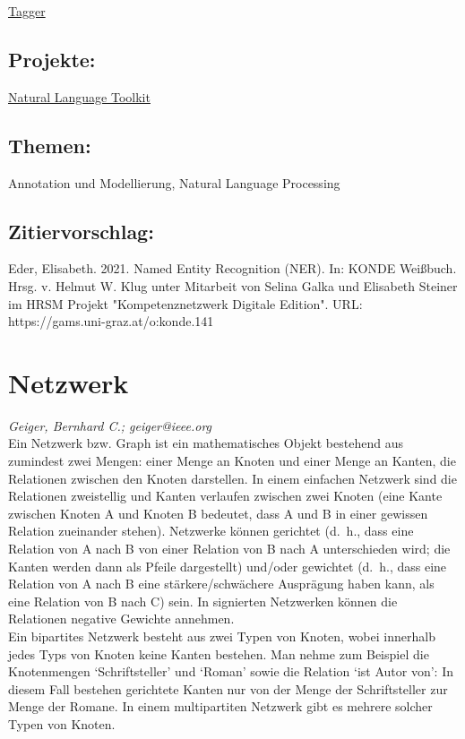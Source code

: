\documentclass{article}
\begin{document}
\href{https://gams.uni-graz.at/o:konde.176}{Tagger}\subsection*{Projekte:}\href{https://www.nltk.org}{Natural Language Toolkit}\subsection*{Themen:}Annotation und Modellierung, Natural Language Processing\subsection*{Zitiervorschlag:}Eder, Elisabeth. 2021. Named Entity Recognition (NER). In: KONDE Weißbuch. Hrsg. v. Helmut W. Klug unter Mitarbeit von Selina Galka und Elisabeth Steiner im HRSM Projekt "Kompetenznetzwerk Digitale Edition". URL: https://gams.uni-graz.at/o:konde.141\newpage\section*{Netzwerk} \emph{Geiger, Bernhard C.; geiger@ieee.org }\\
        
    Ein Netzwerk bzw. Graph ist ein mathematisches Objekt bestehend aus zumindest zwei Mengen: einer Menge an Knoten und einer Menge an Kanten, die Relationen zwischen den Knoten darstellen. In einem einfachen Netzwerk sind die Relationen zweistellig und Kanten verlaufen zwischen zwei Knoten (eine Kante zwischen Knoten A und Knoten B bedeutet, dass A und B in einer gewissen Relation zueinander stehen). Netzwerke können gerichtet (d. h., dass eine Relation von A nach B von einer Relation von B nach A unterschieden wird; die Kanten werden dann als Pfeile dargestellt) und/oder gewichtet (d. h., dass eine Relation von A nach B eine stärkere/schwächere Ausprägung haben kann, als eine Relation von B nach C) sein. In signierten Netzwerken können die Relationen negative Gewichte annehmen. \\
            
        Ein bipartites Netzwerk besteht aus zwei Typen von Knoten, wobei innerhalb jedes Typs von Knoten keine Kanten bestehen. Man nehme zum Beispiel die Knotenmengen ‘Schriftsteller’ und ‘Roman’ sowie die Relation ‘ist Autor von’: In diesem Fall bestehen gerichtete Kanten nur von der Menge der Schriftsteller zur Menge der Romane. In einem multipartiten Netzwerk gibt es mehrere solcher Typen von Knoten. \\
            
\end{document}

